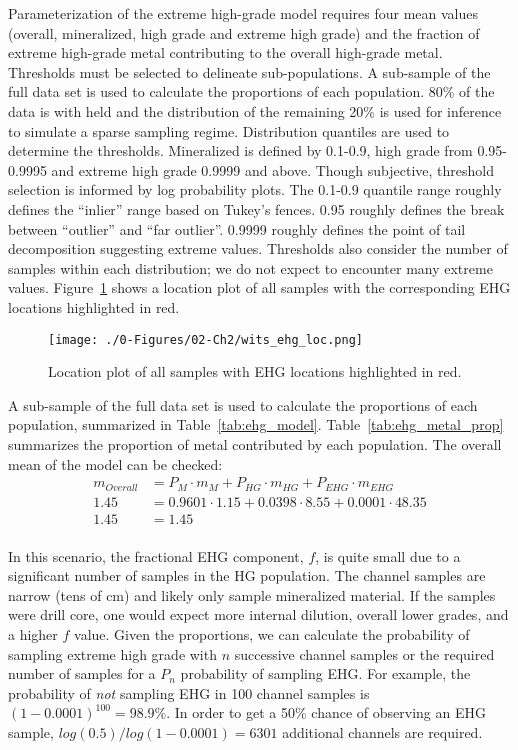 Parameterization of the extreme high-grade model requires four mean values (overall, mineralized, high grade and extreme high grade) and the fraction of extreme high-grade metal contributing to the overall high-grade metal. Thresholds must be selected to delineate sub-populations. A sub-sample of the full data set is used to calculate the proportions of each population. 80\% of the data is with held and the distribution of the remaining 20\% is used for inference to simulate a sparse sampling regime. Distribution quantiles are used to determine the thresholds. Mineralized is defined by 0.1-0.9, high grade from 0.95-0.9995 and extreme high grade 0.9999 and above. Though subjective, threshold selection is informed by log probability plots. The 0.1-0.9 quantile range roughly defines the ``inlier'' range based on Tukey's fences. 0.95 roughly defines the break between ``outlier'' and ``far outlier''. 0.9999 roughly defines the point of tail decomposition suggesting extreme values. Thresholds also consider the number of samples within each distribution; we do not expect to encounter many extreme values. Figure~\ref{fig:wits_ehg_loc} shows a location plot of all samples with the corresponding EHG locations highlighted in red.

\begin{figure}[htb!]
    \centering
    \texttt{[image: ./0-Figures/02-Ch2/wits\_ehg\_loc.png]}
    \caption{Location plot of all samples with EHG locations highlighted in red.}
    \label{fig:wits_ehg_loc}
\end{figure}

A sub-sample of the full data set is used to calculate the proportions of each population, summarized in Table~\ref{tab:ehg_model}. Table~\ref{tab:ehg_metal_prop} summarizes the proportion of metal contributed by each population. The overall mean of the model can be checked:
\begin{align*}
    m_{Overall} &= P_{M} \cdot m_{M}  + P_{HG} \cdot m_{HG} + P_{EHG} \cdot m_{EHG} \\
    1.45 &= 0.9601 \cdot 1.15 + 0.0398 \cdot 8.55 + 0.0001 \cdot 48.35 \\
    1.45 &= 1.45 \\
\end{align*}



In this scenario, the fractional EHG component, $f$, is quite small due to a significant number of samples in the HG population. The channel samples are narrow (tens of cm) and likely only sample mineralized material. If the samples were drill core, one would expect more internal dilution, overall lower grades, and a higher $f$ value. Given the proportions, we can calculate the probability of sampling extreme high grade with $n$ successive channel samples or the required number of samples for a $P_n$ probability of sampling EHG. For example, the probability of \emph{not} sampling EHG in 100 channel samples is $(1-0.0001)^{100} = 98.9\%$. In order to get a 50\% chance of observing an EHG sample, $log(0.5)/log(1-0.0001) = 6301$ additional channels are required. 

